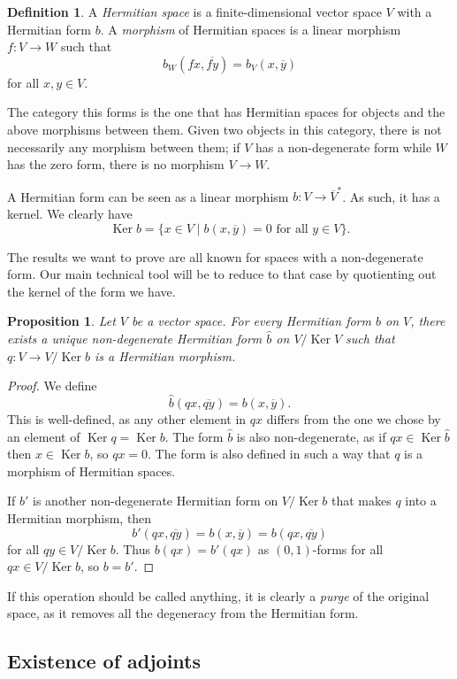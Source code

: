 \documentclass[10pt,a4paper]{amsart}
\newtheorem{prop}[theo]{Proposition}
\theoremstyle{definition}
\newtheorem{defi}[theo]{Definition}
\def\ov#1{\overline{#1}}
\DeclareMathOperator{\Ker}{Ker}
\begin{document}
\begin{defi}
A \emph{Hermitian space} is a finite-dimensional vector space $V$ with a Hermitian form $b$.
A \emph{morphism} of Hermitian spaces is a linear morphism $f : V \to W$ such that
\[
b_W(fx, \ov{fy}) = b_V(x, \ov y)
\]
for all $x, y \in V$.
\end{defi}

The category this forms is the one that has Hermitian spaces for objects and the above morphisms between them. Given two objects in this category, there is not necessarily any morphism between them; if $V$ has a non-degenerate form while $W$ has the zero form, there is no morphism $V \to W$.

A Hermitian form can be seen as a linear morphism $b : V \to \ov V^*$. As such, it has a kernel. We clearly have
\[
\Ker b = \{ x \in V \mid b(x, \ov y) = 0 \text{ for all $y \in V$}\}.
\]


The results we want to prove are all known for spaces with a non-degenerate form. Our main technical tool will be to reduce to that case by quotienting out the kernel of the form we have.

\begin{prop}
Let $V$ be a vector space. For every Hermitian form $b$ on $V$, there exists a unique non-degenerate Hermitian form $\hat b$ on $V / \Ker V$ such that $q : V \to V/\Ker b$ is a Hermitian morphism.
\end{prop}


\begin{proof}
We define
\[
\hat b(qx, \ov{qy})
= b(x, \ov y).
\]
This is well-defined, as any other element in $qx$ differs from the one we chose by an element of $\Ker q = \Ker b$. The form $\hat b$ is also non-degenerate, as if $qx \in \Ker \hat b$ then $x \in \Ker b$, so $qx = 0$. The form is also defined in such a way that $q$ is a morphism of Hermitian spaces.

If $b'$ is another non-degenerate Hermitian form on $V / \Ker b$ that makes $q$ into a Hermitian morphism, then
\[
b'(qx, \ov{qy})
= b(x, \ov{y})
= b(qx, \ov{qy})
\]
for all $qy \in V / \Ker b$. Thus $b(qx) = b'(qx)$ as $(0,1)$-forms for all $qx \in V / \Ker b$, so $b = b'$.
\end{proof}


If this operation should be called anything, it is clearly a \emph{purge} of the original space, as it removes all the degeneracy from the Hermitian form.



\subsection*{Existence of adjoints}
\label{sec:existence-adjoints}
\end{document}
